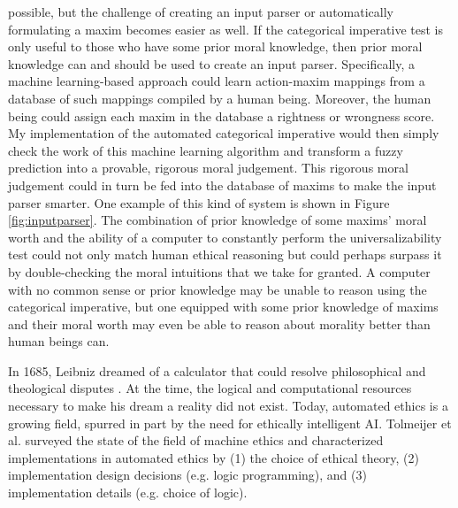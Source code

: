 \begin{isabellebody}
\begin{isamarkuptext}
possible, but the challenge of creating an input parser or automatically formulating a maxim becomes 
easier as well. 
If the categorical imperative test is only useful to those who have some prior moral knowledge, then prior moral
knowledge can and should be used to create an input parser. Specifically, a machine learning-based approach
could learn action-maxim mappings from a database of such mappings compiled by a human being. Moreover, 
the human being could assign each maxim in the database a rightness or wrongness score. My implementation
of the automated categorical imperative would then simply check the work of this machine learning algorithm and transform
a fuzzy prediction into a provable, rigorous moral judgement. This rigorous moral judgement
could in turn be fed into the database of maxims to make the input parser smarter. One example of 
this kind of system is shown in Figure \ref{fig:inputparser}. The combination of 
prior knowledge of some maxims' moral worth and the ability of a computer to constantly perform the
universalizability test could not only match human ethical reasoning but could perhaps surpass it
by double-checking the moral intuitions that we take for granted. A computer with no common sense or prior knowledge
may be unable to reason using the categorical imperative, but one equipped with some prior knowledge
of maxims and their moral worth may even be able to reason about morality better than human beings can.%
\end{isamarkuptext}\isamarkuptrue%
%
\isadelimdocument
%
\endisadelimdocument
%
\isatagdocument
%
\isamarkuptrue%
%
\endisatagdocument
{\isafolddocument}%
%
\isadelimdocument
%
\endisadelimdocument
%
\begin{isamarkuptext}%
In 1685, Leibniz dreamed of a calculator that could resolve philosophical and theological 
disputes \citep{leibniz}. At the time, the logical and computational resources necessary to make his 
dream a reality did not exist. Today, automated ethics is a growing field, spurred in part by the 
need for ethically intelligent AI. Tolmeijer et al. surveyed the state of the field of 
machine ethics \citep{mesurvey} and characterized implementations in automated ethics by (1) the choice 
of ethical theory, (2) implementation design decisions (e.g. logic programming), and (3) implementation 
details (e.g. choice of logic). 


\end{isamarkuptext}
\end{isabellebody}
